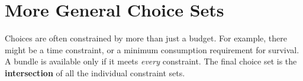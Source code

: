 \section{More General Choice Sets}
Choices are often constrained by more than just a budget. For example, there might be a time constraint, or a minimum consumption requirement for survival. A bundle is available only if it meets \textit{every} constraint. The final choice set is the \textbf{intersection} of all the individual constraint sets.